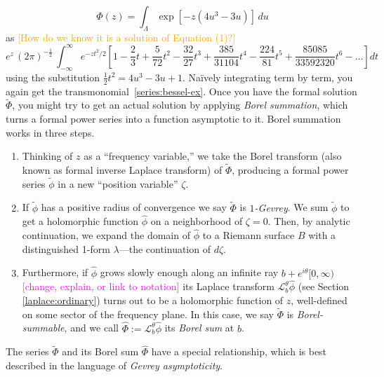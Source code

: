 \documentclass{article}
\theoremstyle{definition}
\newcommand{\series}[1]{\tilde{#1}}
\newcommand{\laplace}{\mathcal{L}}
\theoremstyle{plain}
\begin{document}
\[ \Phi(z) = \int_{\Lambda} \exp\left[-z \left(4 u^3 - 3 u\right)\right]\,du \]
as
\textcolor{orange}{[How do we know it is a solution of Equation (1)?]}
\color{orange}
\[ e^{z}\, (2\pi)^{-\tfrac{1}{2}}\, \int_{-\infty}^\infty e^{-z t^2/2} \left[ 1 - \frac{2}{3} t + \frac{5}{72} t^2 - \frac{32}{27} t^3 + \frac{385}{31104} t^4 - \frac{224}{81} t^5 + \frac{85085}{33592320} t^6 - \ldots \right] dt \]
using the substitution $\tfrac{1}{2} t^2 = 4 u^3 - 3 u + 1$. Na\"{i}vely integrating term by term, you again get the transmonomial~\eqref{series:bessel-ex}.
\color{black}
Once you have the formal solution $\series{\Phi}$, you might try to get an actual solution by applying {\em Borel summation}, which turns a formal power series into a function asymptotic to it. Borel summation works in three steps.
\begin{enumerate}
\item Thinking of $z$ as a ``frequency variable,'' we take the Borel transform (also known as formal inverse Laplace transform) of $\series{\Phi}$, producing a formal power series $\series{\phi}$ in a new ``position variable'' $\zeta$.
\item If $\series{\phi}$ has a positive radius of convergence we say $\series{\Phi}$ is {\em $1$-Gevrey}. We sum $\series{\phi}$ to get a holomorphic function $\hat{\phi}$ on a neighborhood of $\zeta = 0$. Then, by analytic continuation, we expand the domain of $\hat{\phi}$ to a Riemann surface $B$ with a distinguished 1-form $\lambda$---the continuation of $d\zeta$. %
\item Furthermore, if $\hat{\phi}$ grows slowly enough along an infinite ray $b + e^{i\theta}[0, \infty)$ \textcolor{magenta}{[change, explain, or link to notation]} its Laplace transform $\laplace_b^\theta \hat{\phi}$ (see Section \ref{laplace:ordinary}) turns out to be a holomorphic function of $z$, well-defined on some sector of the frequency plane. In this case, we say $\tilde{\Phi}$ is {\em Borel-summable}, and we call $\hat{\Phi}:=\laplace_b^\theta \hat{\phi}$ its {\em Borel sum} at $b$. 
\end{enumerate}
The series $\series{\Phi}$ and its Borel sum $\hat{\Phi}$ have a special relationship, which is best described in the language of {\em Gevrey asymptoticity}. %
\end{document}
